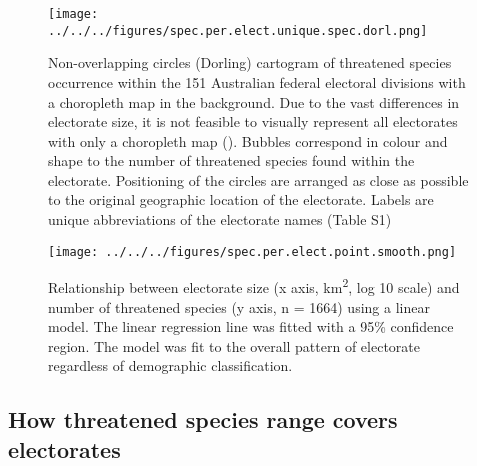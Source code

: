 \documentclass[a4paper,11pt]{article}
\begin{document}
\begin{figure}[H]
	\centering
    \texttt{[image: ../../../figures/spec.per.elect.unique.spec.dorl.png]}
    \caption{Non-overlapping circles (Dorling) cartogram of threatened species occurrence within the 151 Australian federal electoral divisions with a choropleth map in the background. Due to the vast differences in electorate size, it is not feasible to visually represent all electorates with only a choropleth map (\cite{tomasettiMappingAustraliaElectorates2021}). Bubbles correspond in colour and shape to the number of threatened species found within the electorate. Positioning of the circles are arranged as close as possible to the original geographic location of the electorate. Labels are unique abbreviations of the electorate names (Table S1)}
    \label{fig:dorl}
\end{figure}


\begin{figure}[H]
	\centering
    \texttt{[image: ../../../figures/spec.per.elect.point.smooth.png]}
    \caption{Relationship between electorate size (x axis, km\textsuperscript{2}, log 10 scale) and number of threatened species (y axis, n = 1664) using a linear model. The linear regression line was fitted with a 95\% confidence region. The model was fit to the overall pattern of electorate regardless of demographic classification.}
    \label{fig:point_smooth}
\end{figure}

\subsection{How threatened species range covers electorates}
\end{document}
